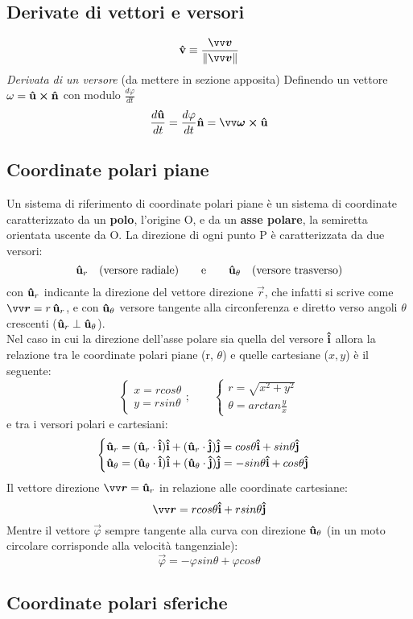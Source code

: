
\subsection*{Derivate di vettori e versori }
\[
     \v{v} \equiv \frac{\vec{v}}{\Norm{v}}
\]
\emph{Derivata di un versore} (da mettere in sezione apposita)
Definendo un vettore $\omega = \mathbf{\hat{u}} \cross \mathbf{\hat{n}}$ con modulo $\frac{d \varphi}{dt}$
\[
 \frac{d\v{u}}{dt} = \frac{d \varphi}{dt} \v{n} = \vec{\omega} \cross \v{u}     
\]

\subsection*{Coordinate polari piane}
Un sistema di riferimento di coordinate polari piane è un sistema di coordinate 
caratterizzato da un \textbf{polo}, l'origine O, e da un \textbf{asse polare},
la semiretta orientata uscente da O. La direzione di ogni punto P è caratterizzata
da due versori:
\[
 \mathbf{\hat{u}}_r \quad (\text{versore radiale}) \qquad \text{e} \qquad \mathbf{\hat{u}}_{\theta}
 \quad  \text{(versore trasverso)}     
\]
con $\mathbf{\hat{u}}_r$ indicante la direzione del vettore direzione $\vec{r}$, che infatti si 
scrive come $\vec{r} = r \, \v{u}_r$, e con $\mathbf{\hat{u}}_{\theta}$ versore tangente alla 
circonferenza e diretto verso angoli $\theta$ crescenti ($\mathbf{\hat{u}}_r \perp \mathbf{\hat{u}}_{\theta}$).\\
Nel caso in cui la direzione dell'asse polare
sia quella del versore $\mathbf{\hat{i}}$ allora la relazione tra le coordinate polari piane (r, $\theta$)
e quelle cartesiane ($x,y$) è il seguente:
\[
\begin{cases}
     x = r cos \theta \\
     y = r sin \theta
\end{cases}
; \qquad
\begin{cases}
     r = \sqrt{x^2 + y^2} \\
     \theta = arctan \frac{y}{x}
\end{cases}     
\]
e tra i versori polari e cartesiani:
\[
\begin{cases}
     \mathbf{\hat{u}}_r = (\mathbf{\hat{u}}_r \cdot \mathbf{\hat{i}})\mathbf{\hat{i}} + (\mathbf{\hat{u}}_r \cdot \mathbf{\hat{j}})\mathbf{\hat{j}} =
     cos \theta\mathbf{\hat{i}} + sin \theta \mathbf{\hat{j}} \\
     \mathbf{\hat{u}}_{\theta}= (\mathbf{\hat{u}}_{\theta} \cdot \mathbf{\hat{i}})\mathbf{\hat{i}} + (\mathbf{\hat{u}}_{\theta} \cdot \mathbf{\hat{j}})\mathbf{\hat{j}} =
     -sin \theta \mathbf{\hat{i}} + cos \theta \mathbf{\hat{j}}
\end{cases}     
\]
Il vettore direzione $\vec{r} = \v{u}_r$ in relazione alle coordinate cartesiane:
\[
     \vec{r} = r cos \theta \v{i} + r sin \theta \v{j}     
\]
Mentre il vettore $\vec{\varphi}$ sempre tangente alla curva con direzione $\mathbf{\hat{u}}_{\theta}$
(in un moto circolare corrisponde alla velocità tangenziale): 
\[
    \vec{\varphi} = - \varphi sin \theta + \varphi cos \theta     
\]
\subsection*{Coordinate polari sferiche}
